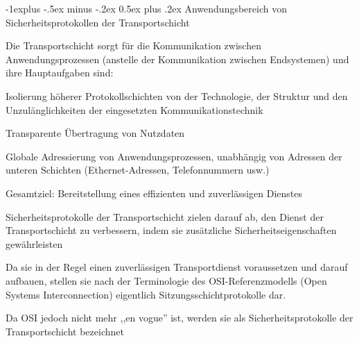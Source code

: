 \documentclass[a4paper]{article}
\makeatletter
\renewcommand{\subsection}{\@startsection{subsection}{2}{0mm}%
 {-1explus -.5ex minus -.2ex}%
 {0.5ex plus .2ex}%
 {\normalfont\normalsize\bfseries}}
\makeatother
\begin{document}
\begin{multicols}{3}
\begin{itemize*}
            \subsection{Anwendungsbereich von Sicherheitsprotokollen der
                  Transportschicht}
            \begin{itemize*}
                  \item Die Transportschicht sorgt für die Kommunikation zwischen
                  Anwendungsprozessen (anstelle der Kommunikation zwischen Endsystemen)
                  und ihre Hauptaufgaben sind:
                  \begin{itemize*}
                        \item Isolierung höherer Protokollschichten von der Technologie, der Struktur und den Unzulänglichkeiten der eingesetzten Kommunikationstechnik
                        \item Transparente Übertragung von Nutzdaten
                        \item Globale Adressierung von Anwendungsprozessen, unabhängig von Adressen der unteren Schichten (Ethernet-Adressen, Telefonnummern usw.)
                        \item Gesamtziel: Bereitstellung eines effizienten und zuverlässigen Dienstes
                  \end{itemize*}
                  \item Sicherheitsprotokolle der Transportschicht zielen darauf ab, den
                  Dienst der Transportschicht zu verbessern, indem sie zusätzliche
                  Sicherheitseigenschaften gewährleisten
                  \begin{itemize*}
                        \item Da sie in der Regel einen zuverlässigen Transportdienst voraussetzen und darauf aufbauen, stellen sie nach der Terminologie des OSI-Referenzmodells (Open Systems Interconnection) eigentlich Sitzungsschichtprotokolle dar.
                        \item Da OSI jedoch nicht mehr ,,en vogue'' ist, werden sie als Sicherheitsprotokolle der Transportschicht bezeichnet
                  \end{itemize*}
            \end{itemize*}


\end{itemize*}
\end{multicols}
\end{document}
